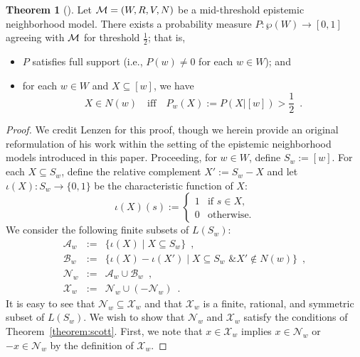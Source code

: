 \documentclass[12pt]{article}
\theoremstyle{definition}
\newtheorem{theorem}{Theorem}[section]
\newcommand{\M}{{\cal M}}      %
\begin{document}
\begin{theorem}[\cite{Lenzen1980:gwuw}]
  \label{theorem:lenzen}
  Let $\M=(W,R,V,N)$ be a mid-threshold epistemic neighborhood model.
  There exists a probability measure $P:\wp(W)\to[0,1]$ agreeing with
  $\M$ for threshold $\frac 12$; that is,
  \begin{itemize}
  \item $P$ satisfies full support (i.e., $P(w)\neq0$ for each
    $w\in W$); and

  \item for each $w\in W$ and $X\subseteq[w]$, we have
    \[
    \textstyle X\in N(w) \quad\text{iff}\quad
    P_w(X):=P(X|[w])>\frac 12\enspace.
    \]
  \end{itemize}
\end{theorem}
\begin{proof}
  We credit Lenzen \cite{Lenzen1980:gwuw} for this proof, though we
  herein provide an original reformulation of his work within the
  setting of the epistemic neighborhood models introduced in this
  paper.  Proceeding, for $w\in W$, define $S_w:=[w]$.  For each
  $X\subseteq S_w$, define the relative complement $X':=S_w-X$ and let
  $\iota(X):S_w\to\{0,1\}$ be the characteristic function of $X$:
  \[
  \iota(X)(s):=\begin{cases}
    1 & \text{if } s\in X, \\
    0 & \text{otherwise.}
  \end{cases}
  \]
  We consider the following finite subsets of $L(S_w)$:
  \begin{eqnarray*}
    \mathcal{A}_w &:=& 
    \{\iota(X)\mid X\subseteq S_w\}\enspace, 
    \\
    \mathcal{B}_w &:=& 
    \{\iota(X)-\iota(X')\mid X\subseteq S_w 
    \text{ \& } X'\notin N(w)\}\enspace,
    \\
    \mathcal{N}_w &:=&
    \mathcal{A}_w\cup\mathcal{B}_w\enspace,
    \\
    \mathcal{X}_w &:=&
    \mathcal{N}_w\cup(-\mathcal{N}_w)\enspace.
  \end{eqnarray*}
  It is easy to see that $\mathcal{N}_w\subseteq\mathcal{X}_w$
  and that $\mathcal{X}_w$ is a finite, rational, and symmetric
  subset of $L(S_w)$.  We wish to show that $\mathcal{N}_w$
  and $\mathcal{X}_w$ satisfy the conditions of
  Theorem~\ref{theorem:scott}. First, we note that
  $x\in\mathcal{X}_w$ implies $x\in\mathcal{N}_w$ or
  $-x\in\mathcal{N}_w$ by the definition of $\mathcal{X}_w$.


\end{proof}
\end{document}
